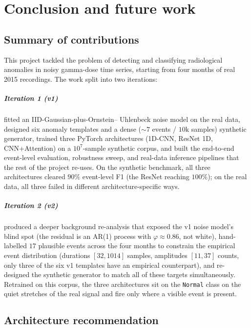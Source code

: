 \chapter{Conclusion and future work}
\label{chap:conclusion}

\section{Summary of contributions}
\label{sec:conc-summary}

This project tackled the problem of detecting and classifying
radiological anomalies in noisy gamma-dose time series, starting from
four months of real 2015 recordings. The work split into two
iterations:

\paragraph{Iteration 1 (v1)} fitted an IID-Gaussian-plus-Ornstein--
Uhlenbeck noise model on the real data, designed six anomaly templates
and a dense ($\sim 7$ events / $10\text{k}$ samples) synthetic
generator, trained three PyTorch architectures (1D-CNN, ResNet 1D,
CNN+Attention) on a $10^{7}$-sample synthetic corpus, and built the
end-to-end event-level evaluation, robustness sweep, and real-data
inference pipelines that the rest of the project re-uses. On the
synthetic benchmark, all three architectures cleared $90\%$
event-level F1 (the ResNet reaching $100\%$); on the real data, all
three failed in different architecture-specific ways.

\paragraph{Iteration 2 (v2)} produced a deeper background re-analysis
that exposed the v1 noise model's blind spot (the residual is an
AR(1) process with $\varphi \approx 0.86$, not white), hand-labelled
$17$ plausible events across the four months to constrain the
empirical event distribution (durations $[32, 1014]$ samples,
amplitudes $[11, 37]$ counts, only three of the six v1 templates
have an empirical counterpart), and re-designed the synthetic
generator to match all of these targets simultaneously. Retrained on
this corpus, the three architectures sit on the \texttt{Normal} class
on the quiet stretches of the real signal and fire only where a
visible event is present.

\section{Architecture recommendation}
\label{sec:conc-archi}


